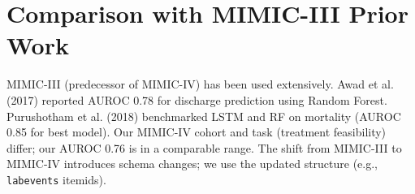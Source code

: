 \section{Comparison with MIMIC-III Prior Work}

MIMIC-III (predecessor of MIMIC-IV) has been used extensively. Awad et al. (2017) reported AUROC 0.78 for discharge prediction using Random Forest. Purushotham et al. (2018) benchmarked LSTM and RF on mortality (AUROC 0.85 for best model). Our MIMIC-IV cohort and task (treatment feasibility) differ; our AUROC 0.76 is in a comparable range. The shift from MIMIC-III to MIMIC-IV introduces schema changes; we use the updated structure (e.g., \texttt{labevents} itemids).
